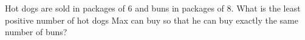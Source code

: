 Hot dogs are sold in packages of $6$ and buns in packages of $8$. What is the least positive number of hot dogs Max can buy so that he can buy exactly the same number of buns?
